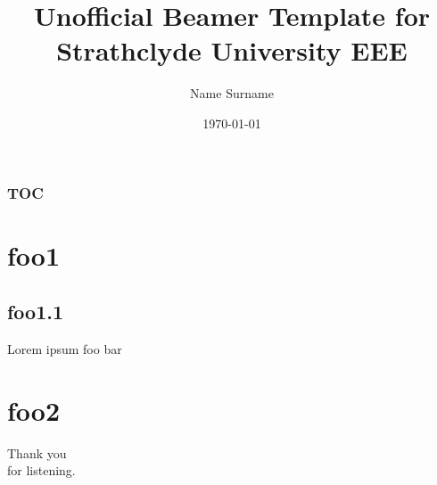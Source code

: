 \documentclass{beamer}
\author{Name Surname}
\title{Unofficial Beamer Template for Strathclyde University EEE}
\date{\today}
\begin{document}
\begin{frame}

\titlepage
\end{frame}

\begin{frame}
	\frametitle{TOC}
	\tableofcontents
\end{frame}

\section{foo1}
\subsection{foo1.1}
\begin{frame}{Lorem ipsum}
foo bar
\end{frame}



\section{foo2}
\begin{frame}
\vfill
\begin{center}\begin{Huge}Thank you \\[10pt]
for listening.\end{Huge}\vfill
\end{center}
\vfill
\end{frame}
\end{document}
